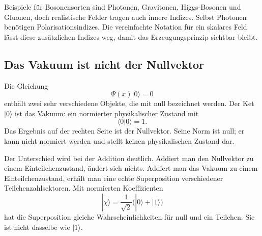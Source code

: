 Beispiele für Bosonensorten sind Photonen, Gravitonen, Higgs-Bosonen und Gluonen, doch realistische Felder tragen auch innere Indizes. Selbst Photonen benötigen Polarisationsindizes. Die vereinfachte Notation für ein skalares Feld lässt diese zusätzlichen Indizes weg, damit das Erzeugungsprinzip sichtbar bleibt.

\subsection{Das Vakuum ist nicht der Nullvektor}

Die Gleichung
\begin{equation}
\Psi(x)|0\rangle=0
\end{equation}
enthält zwei sehr verschiedene Objekte, die mit null bezeichnet werden. Der Ket \(|0\rangle\) ist das Vakuum: ein normierter physikalischer Zustand mit
\begin{equation}
\langle0|0\rangle=1.
\end{equation}
Das Ergebnis auf der rechten Seite ist der Nullvektor. Seine Norm ist null; er kann nicht normiert werden und stellt keinen physikalischen Zustand dar.

Der Unterschied wird bei der Addition deutlich. Addiert man den Nullvektor zu einem Einteilchenzustand, ändert sich nichts. Addiert man das Vakuum zu einem Einteilchenzustand, erhält man eine echte Superposition verschiedener Teilchenzahlsektoren. Mit normierten Koeffizienten
\begin{equation}
|\chi\rangle=\frac{1}{\sqrt2}\bigl(|0\rangle+|1\rangle\bigr)
\end{equation}
hat die Superposition gleiche Wahrscheinlichkeiten für null und ein Teilchen. Sie ist nicht dasselbe wie \(|1\rangle\).

\begin{classroomqa}
\end{classroomqa}

\begin{classroomqa}
\end{classroomqa}


